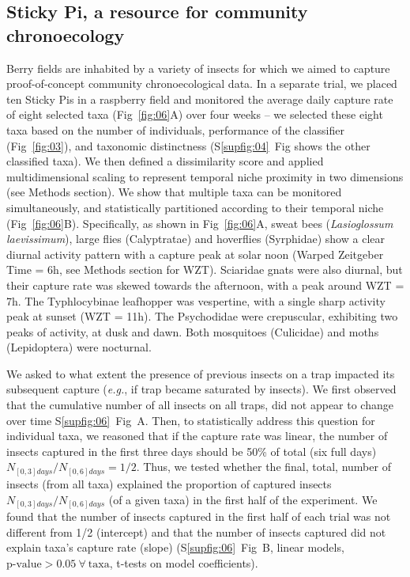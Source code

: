 \documentclass[12pt]{article}
\begin{document}
\begin{linenumbers}
		\subsection*{Sticky Pi, a resource for community chronoecology}
		
		Berry fields are inhabited by a variety of insects for which we aimed to capture proof-of-concept community chronoecological data. In a separate trial, we placed ten Sticky Pis in a raspberry field and monitored the average daily capture rate of eight selected taxa (Fig~\ref{fig:06}A) over four weeks – we selected these eight taxa based on the number of individuals, performance of the classifier (Fig~\ref{fig:03}), and taxonomic distinctness (S\ref{supfig:04}~Fig shows the other classified taxa). We then defined a dissimilarity score and applied multidimensional scaling to represent temporal niche proximity in two dimensions (see Methods section). We show that multiple taxa can be monitored simultaneously, and statistically partitioned according to their temporal niche (Fig~\ref{fig:06}B). Specifically, as shown in Fig~\ref{fig:06}A, sweat bees (\emph{Lasioglossum laevissimum}), large flies (Calyptratae) and hoverflies (Syrphidae) show a clear diurnal activity pattern with a capture peak at solar noon (Warped Zeitgeber Time = 6h, see Methods section for WZT). Sciaridae gnats were also diurnal, but their capture rate was skewed towards the afternoon, with a peak around WZT = 7h. The Typhlocybinae leafhopper was vespertine, with a single sharp activity peak at sunset (WZT = 11h). The Psychodidae were crepuscular, exhibiting two peaks of activity, at dusk and dawn. Both mosquitoes (Culicidae) and moths (Lepidoptera) were nocturnal. 		
		
        We asked to what extent the presence of previous insects on a trap impacted its subsequent capture (\emph{e.g.}, if trap became saturated by insects). We first observed that the cumulative number of all insects on all traps, did not appear to change over time S\ref{supfig:06}~Fig~A. Then, to statistically address this question for individual taxa, we reasoned that if the capture rate was linear, the number of insects captured in the first three days should be 50\% of total (six full days) $N_{[0,3]days} / N_{[0, 6]days} = 1/2$. 
		Thus, we tested whether the final, total, number of insects (from all taxa) explained the proportion of captured insects $N_{[0,3]days} / N_{[0,6]days}$ (of a given taxa) in the first half of the experiment. 
		We found that the number of insects captured in the first half of each trial was not different from 1/2 (intercept) and that the number of insects captured did not explain taxa's capture rate (slope) (S\ref{supfig:06}~Fig~B, linear models, $\text{p-value} > 0.05~\forall~\text{taxa}$,  t-tests on model coefficients).
		


\end{linenumbers}
\end{document}
